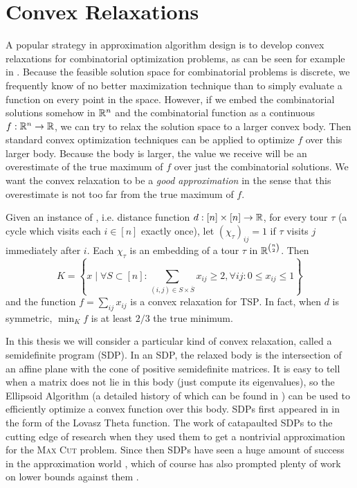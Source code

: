\section{Convex Relaxations}
A popular strategy in approximation algorithm design is to develop convex relaxations for combinatorial optimization problems, as can be seen for example in \cite{GW95,ARV09,Li13,VY99}. 
Because the feasible solution space for combinatorial problems is discrete, we frequently know of no better maximization technique than to simply evaluate a function on every point in the space. However, if we embed the combinatorial solutions somehow in $\mathbb R^n$ and the combinatorial function as a continuous $f: \mathbb R^n \rightarrow \mathbb R$, we can try to relax the solution space to a larger convex body. Then standard convex optimization techniques can be applied to optimize $f$ over this larger body. Because the body is larger, the value we receive will be an overestimate of the true maximum of $f$ over just the combinatorial solutions. We want the convex relaxation to be a \emph{good approximation} in the sense that this overestimate is not too far from the true maximum of $f$. 
\begin{example}
Given an instance of , i.e. distance function $d: [n] \times [n] \rightarrow \mathbb R$, for every tour $\tau$ (a cycle which visits each $i \in [n]$ exactly once), let $(\chi_\tau)_{ij} = 1$ if $\tau$ visits $j$ immediately after $i$. Each $\chi_\tau$ is an embedding of a tour $\tau$ in $\mathbb R^{\binom{n}{2}}$. Then 
\[K = \left\{x \mid \forall S \subset [n]: \sum_{(i,j) \in S \times \overline{S}} x_{ij} \geq 2, \forall ij: 0 \leq x_{ij} \leq 1\right\}\]
and the function $f = \sum_{ij} x_{ij}$ is a convex relaxation for \textsc{TSP}. In fact, when $d$ is symmetric, $\min_K f$ is at least $2/3$ the true minimum. 
\end{example}

In this thesis we will consider a particular kind of convex relaxation, called a semidefinite program (SDP). In an SDP, the relaxed body is the intersection of an affine plane with the cone of positive semidefinite matrices. It is easy to tell when a matrix does not lie in this body (just compute its eigenvalues), so the Ellipsoid Algorithm (a detailed history of which can be found in \cite{Akg84}) can be used to efficiently optimize a convex function over this body. SDPs first appeared in \cite{Lovasz79} in the form of the Lovasz Theta function. The work of \cite{GW95} catapaulted SDPs to the cutting edge of research when they used them to get a nontrivial approximation for the \textsc{Max Cut} problem. Since then SDPs have seen a huge amount of success in the approximation world \cite{ARV09,TS15,PW07,Kar09,CMM09,Chlam07,FJ97,HZ99,Ragh08}, which of course has also prompted plenty of work on lower bounds against them \cite{BPZ15,LRS15,BCVVZ12,RS09,BDP15}. 


